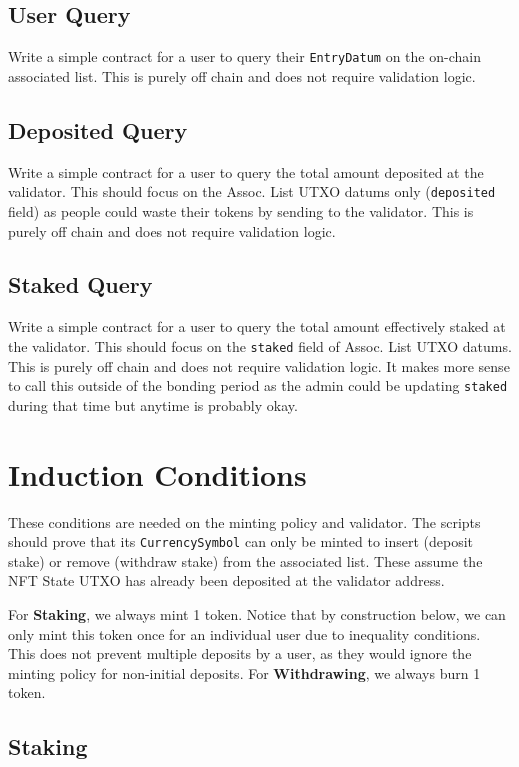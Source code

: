 \documentclass[10pt, a4paper]{article}
\theoremstyle{definition}
\begin{document}
\subsection{User Query}\label{subsection:UserQuery}
Write a simple contract for a user to query their \texttt{EntryDatum} on the on-chain associated list. This is purely off chain and does not require validation logic.

\subsection{Deposited Query}\label{subsection:DepositedQuery}
Write a simple contract for a user to query the total amount deposited at the validator. This should focus on the Assoc. List UTXO datums only (\texttt{deposited} field) as people could waste their tokens by sending to the validator. This is purely off chain and does not require validation logic.

\subsection{Staked Query}\label{subsection:StakedQuery}
Write a simple contract for a user to query the total amount effectively staked at the validator. This should focus on the \texttt{staked} field of Assoc. List UTXO datums. This is purely off chain and does not require validation logic. It makes more sense to call this outside of the bonding period as the admin could be updating \texttt{staked} during that time but anytime is probably okay.

\section{Induction Conditions}\label{section:Induction}
These conditions are needed on the minting policy and validator. The scripts should prove that its \texttt{CurrencySymbol} can only be minted to insert (deposit stake) or remove (withdraw stake) from the associated list. These assume the NFT State UTXO has already been deposited at the validator address.

For \textbf{Staking}, we always mint 1 token. Notice that by construction below, we can only mint this token once for an individual user due to inequality conditions. This does not prevent multiple deposits by a user, as they would ignore the minting policy for non-initial deposits.
For \textbf{Withdrawing}, we always burn 1 token.

\subsection{Staking}\label{subsection:staking}
\end{document}
